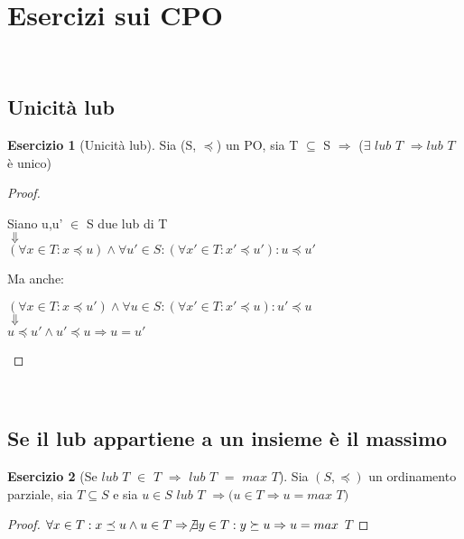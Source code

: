 \documentclass[a4paper, 10pt]{article} %
\begin{document}
\newpage
\section{Esercizi sui CPO}

\theoremstyle{definition}
\newtheorem{esercizio}{Esercizio}

\
\subsection{Unicità lub}
\begin{esercizio}[Unicità lub]
  Sia (S, $\preceq$) un PO, sia T $\subseteq$ S $\Rightarrow$ ($\exists$ $lub$ $T$ $\Rightarrow lub$ $T$ è unico)
\end{esercizio}
\begin{proof}
  \begin{center}
    Siano u,u' $\in$ S due lub di T\\
    $\Downarrow$\\
    $(\forall x \in T : x \preceq u) \land \forall u' \in S :
    (\forall x' \in T : x' \preceq u') : u \preceq u'$
  \end{center}
  Ma anche:
  \begin{center}
    $(\forall x \in T : x \preceq u') \land \forall u \in S :
    (\forall x' \in T : x' \preceq u) : u' \preceq u$\\
    $\Downarrow$\\
    $u \preceq u' \land u' \preceq u \Rightarrow u = u'$
  \end{center}
\end{proof}

\
\subsection{Se il lub appartiene a un insieme è il massimo}
\begin{esercizio}[Se $lub$ $T$ $\in$ $T$ $\Rightarrow$ $lub$ $T$ $=$ $max$ $T$]
  Sia $(S, \preceq)$ un ordinamento parziale, sia $T \subseteq S$ e sia 
  $u \in S$ $lub$ $T$ $\Rightarrow (u \in T \Rightarrow u = max$ $T)$
\end{esercizio}
\begin{proof}
  $\forall x \in T : x \preceq u \land u \in T \Rightarrow \not \exists y \in T : y \succeq u \Rightarrow u = max$ $T$
\end{proof}

\
\end{document}
